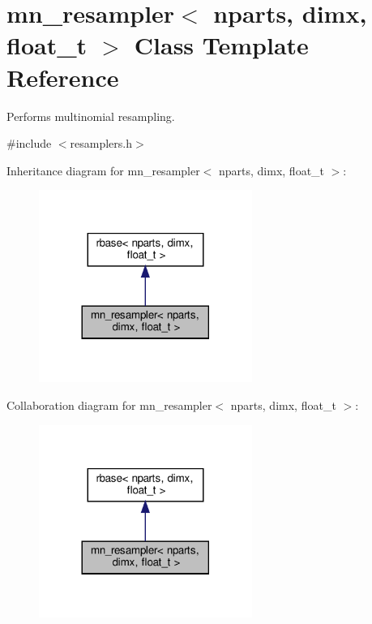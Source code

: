 \hypertarget{classmn__resampler}{}\section{mn\+\_\+resampler$<$ nparts, dimx, float\+\_\+t $>$ Class Template Reference}
\label{classmn__resampler}


Performs multinomial resampling.  




{\ttfamily \#include $<$resamplers.\+h$>$}



Inheritance diagram for mn\+\_\+resampler$<$ nparts, dimx, float\+\_\+t $>$\+:
\nopagebreak
\begin{figure}[H]
\begin{center}
\leavevmode
\includegraphics[width=197pt]{classmn__resampler__inherit__graph}
\end{center}
\end{figure}


Collaboration diagram for mn\+\_\+resampler$<$ nparts, dimx, float\+\_\+t $>$\+:
\nopagebreak
\begin{figure}[H]
\begin{center}
\leavevmode
\includegraphics[width=197pt]{classmn__resampler__coll__graph}
\end{center}
\end{figure}
